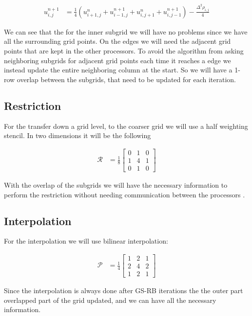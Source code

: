 		\begin{align}
			u^{n+1}_{i,j} &= \frac{1}{4}\left( u^n_{i+1,j} + u^{n +1}_{i-1,j} + u^{n}_{i, j+1} + u^{n+1}_{i,j-1}  \right) - \frac{\Delta^2 \rho_{i,j}}{4}
		\end{align}

		We can see that the for the inner subgrid we will have no problems since we
		have all the surrounding grid points. On the edges we will need the adjacent
		grid points that are kept in the other processors. To avoid the algorithm
		from asking neighboring subgrids for adjacent grid points each time it
		reaches a edge we instead update the entire neighboring column at the start.
		So we will have a 1-row overlap between the subgrids, that need to be updated
		for each iteration.


	\subsection{Restriction}
		For the transfer down a grid level, to the coarser grid we will use a half
		weighting stencil. In two dimensions it will be the following

		\begin{align}
			\mathcal{R} &= \frac{1}{8}
			\begin{bmatrix}
				0 & 1 & 0
				\\
				1 & 4 & 1
				\\
				0 & 1 & 0
			\end{bmatrix}
		\end{align}

		With the overlap of the subgrids we will have the necessary information to
		perform the restriction without needing communication between the processors
		\citep{hackbusch_multigrid_1982}.

	\subsection{Interpolation}
		For the interpolation we will use bilinear interpolation:

		\begin{align}
			\mathcal{P} &= \frac{1}{4}
			\begin{bmatrix}
				1 & 2 & 1
				\\
				2 & 4 & 2
				\\
				1 & 2 & 1
			\end{bmatrix}
		\end{align}

		Since the interpolation is always done after GS-RB iterations the the outer
		part overlapped part of the grid updated, and we can have all the necessary
		information.

